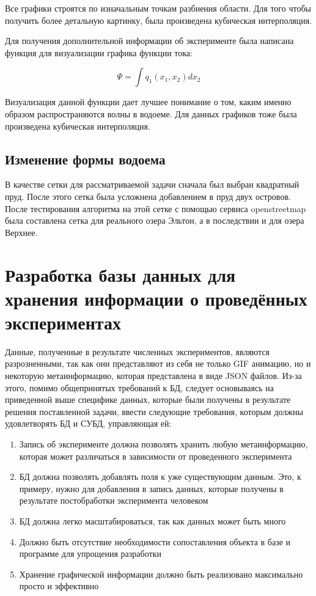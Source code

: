 \documentclass[14pt]{extreport}
\begin{document}
Все графики строятся по изначальным точкам разбиения области. Для того чтобы получить более детальную картинку, была произведена кубическая интерполяция.

Для получения дополнительной информации об эксперименте была написана функция для визуализации графика функции тока:

$$\Psi = \int q_1(x_1, x_2) dx_2$$

Визуализация данной функции дает лучшее понимание о том, каким именно образом распространяются волны в водоеме. Для данных графиков тоже была произведена кубическая интерполяция.

\section{Изменение формы водоема}

В качестве сетки для рассматриваемой задачи сначала был выбран квадратный пруд. После этого сетка была усложнена добавлением в пруд двух островов. После тестирования алгоритма на этой сетке с помощью сервиса openstreetmap была составлена сетка для реального озера Эльтон, а в последствии и для озера Верхнее.

\chapter{Разработка базы данных для хранения информации о проведённых экспериментах}

Данные, полученные в результате численных экспериментов, являются разрозненными, так как они представляют из себя не только GIF анимацию, но и некоторую метаинформацию, которая представлена в виде JSON файлов. Из-за этого, помимо общепринятых требований к БД, следует основываясь на приведенной выше специфике данных, которые были получены в результате решения поставленной задачи, ввести следующие требования, которым должны удовлетворять БД и СУБД, управляющая ей:

\begin{enumerate}

\item Запись об эксперименте должна позволять хранить любую метаинформацию, которая может различаться в зависимости от проведенного эксперимента

\item БД должна позволять добавлять поля к уже существующим данным. Это, к примеру, нужно для добавления в запись данных, которые получены в результате постобработки эксперимента человеком

\item БД должна легко масштабироваться, так как данных может быть много

\item Должно быть отсутствие необходимости сопоставления объекта в базе и программе для упрощения разработки

\item Хранение графической информации должно быть реализовано максимально просто и эффективно

\end{enumerate}
\end{document}
